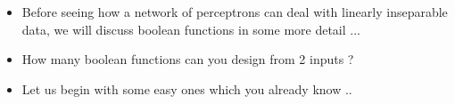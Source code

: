 \documentclass[serif, aspectratio=169]{beamer}
\begin{document}
\begin{frame}
\begin{itemize}\justifying
\item<1-> Before seeing how a network of perceptrons can deal with linearly inseparable data, we will discuss boolean functions in some more detail ...
\end{itemize}
\end{frame}


\begin{frame}
\begin{itemize}\justifying
\item How many boolean functions can you design from 2 inputs ?
\item<2-> Let us begin with some easy ones which you already know ..
\end{itemize}
\end{frame}
\end{document}
